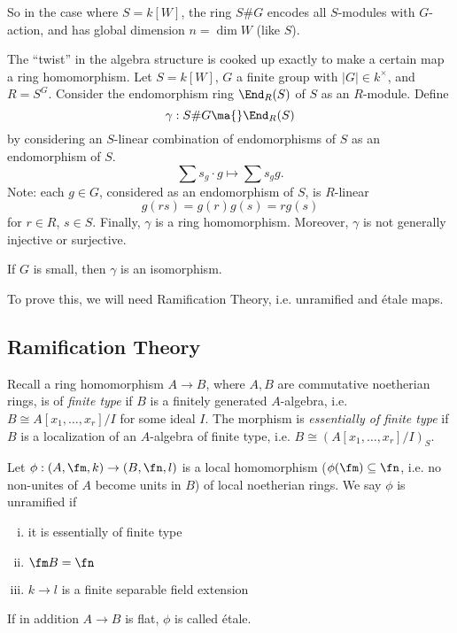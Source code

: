 So in the case where $S= k[W]$, the ring $S\#G$ encodes all $S$-modules with $G$-action, and has global dimension $n= \dim W$ (like $S$). 

The ``twist'' in the algebra structure is cooked up exactly to make a certain map a ring homomorphism. Let $S= k[W]$, $G$ a finite group with $|G| \in k^\times$, and $R= S^G$. Consider the endomorphism ring $\End_R(S)$ of $S$ as an $R$-module. Define
	\[
	\gamma: S\#G \ma{} \End_R(S)
	\]
by considering an $S$-linear combination of endomorphisms of $S$ as an endomorphism of $S$. 
	\[
	\sum s_g \cdot g \mapsto \sum s_g g.
	\]
Note: each $g \in G$, considered as an endomorphism of $S$, is $R$-linear
	\[
	g(rs)= g(r) g(s) = rg(s)
	\]
for $r \in R$, $s \in S$. Finally, $\gamma$ is a ring homomorphism. Moreover, $\gamma$ is not generally injective or surjective.


\begin{thm}[Auslander, 62]
If $G$ is small, then $\gamma$ is an isomorphism.
\end{thm}


To prove this, we will need Ramification Theory, i.e. unramified and \'etale maps. 



\subsection{Ramification Theory}

Recall a ring homomorphism $A \to B$, where $A,B$ are commutative noetherian rings, is of \emph{finite type} if $B$ is a finitely generated $A$-algebra, i.e. $B \cong A[x_1,\ldots,x_r]/I$ for some ideal $I$. The morphism is \emph{essentially of finite type} if $B$ is a localization of an $A$-algebra of finite type, i.e. $B \cong (A[x_1,\ldots,x_r]/I)_S$. 


\begin{dfn}[Ramified]
Let $\phi: (A,\fm,k) \to (B, \fn,l)$ is a local homomorphism ($\phi(\fm) \subseteq \fn$, i.e. no non-unites of $A$ become units in $B$) of local noetherian rings. We say $\phi$ is unramified if
\begin{enumerate}[(i)]
\item it is essentially of finite type
\item $\fm B= \fn$
\item $k \to l$ is a finite separable field extension
\end{enumerate}
If in addition $A \to B$ is flat, $\phi$ is called \'etale. 
\end{dfn}


